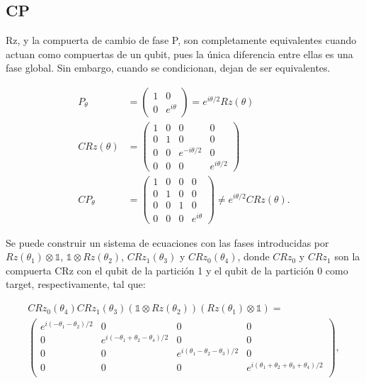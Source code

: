 \subsection{CP}

Rz, y la compuerta de cambio de fase P, son completamente equivalentes cuando actuan como compuertas de un qubit, pues la única diferencia entre ellas es una fase global. Sin embargo, cuando se condicionan, dejan de ser equivalentes.

\begin{align}
    P_\theta &= 
    \begin{pmatrix}
        1 & 0 \\
        0 & e^{i \theta}
    \end{pmatrix} = 
    e^{i \theta/2} Rz(\theta) \\
    CRz(\theta) &= 
    \begin{pmatrix}
        1 & 0 & 0 & 0 \\
        0 & 1 & 0 & 0 \\
        0 & 0 & e^{-i \theta/2} & 0 \\
        0 & 0 & 0 & e^{i \theta/2}
    \end{pmatrix} \\
    CP_\theta &= 
    \begin{pmatrix}
        1 & 0 & 0 & 0 \\
        0 & 1 & 0 & 0 \\
        0 & 0 & 1 & 0 \\
        0 & 0 & 0 & e^{i \theta}
    \end{pmatrix} \neq
    e^{i \theta/2} CRz(\theta) .
\end{align}

Se puede construir un sistema de ecuaciones con las fases introducidas por $Rz(\theta_1) \otimes \mathds{1}$, $\mathds{1} \otimes Rz(\theta_2)$, $CRz_1(\theta_3)$ y $CRz_0(\theta_4)$, donde $CRz_0$ y $CRz_1$ son la compuerta CRz con el qubit de la partición 1 y el qubit de la partición 0 como target, respectivamente, tal que:

\begin{multline}
    CRz_0(\theta_4) CRz_1(\theta_3) (\mathds{1} \otimes Rz(\theta_2)) (Rz(\theta_1) \otimes \mathds{1}) = \\
    \begin{pmatrix}
        e^{i(-\theta_1 - \theta_2)/2} & 0 & 0 & 0 \\
        0 & e^{i(-\theta_1+\theta_2-\theta_4)/2} & 0 & 0 \\
        0 & 0 & e^{i(\theta_1 - \theta_2 - \theta_3)/2} & 0 \\
        0 & 0 & 0 & e^{i(\theta_1 + \theta_2 + \theta_3 + \theta_4)/2} \\
    \end{pmatrix} ,
\end{multline}

